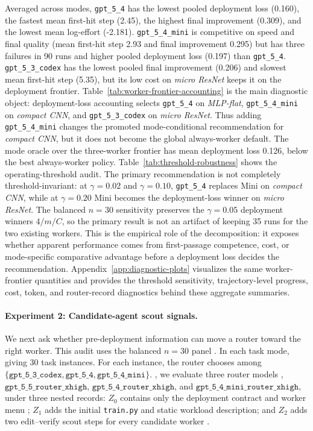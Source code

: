 \documentclass{article}
\begin{document}
Averaged across modes, \texttt{gpt\_5\_4} has the lowest pooled deployment loss (0.160), the fastest mean first-hit step (2.45), the highest final improvement (0.309), and the lowest mean log-effort (-2.181).
\texttt{gpt\_5\_4\_mini} is competitive on speed and final quality (mean first-hit step 2.93 and final improvement 0.295) but has three failures in 90 runs and higher pooled deployment loss (0.197) than \texttt{gpt\_5\_4}.
\texttt{gpt\_5\_3\_codex} has the lowest pooled final improvement (0.206) and slowest mean first-hit step (5.35), but its low cost on \textit{micro ResNet} keeps it on the deployment frontier.
Table~\ref{tab:worker-frontier-accounting} is the main diagnostic object: deployment-loss accounting selects \texttt{gpt\_5\_4} on \textit{MLP-flat}, \texttt{gpt\_5\_4\_mini} on \textit{compact CNN}, and \texttt{gpt\_5\_3\_codex} on \textit{micro ResNet}.
Thus adding \texttt{gpt\_5\_4\_mini} changes the promoted mode-conditional recommendation for \textit{compact CNN}, but it does not become the global always-worker default.
The mode oracle over the three-worker frontier has mean deployment loss 0.126, below the best always-worker policy.
Table~\ref{tab:threshold-robustness} shows the operating-threshold audit.
The primary recommendation is not completely threshold-invariant: at \(\gamma=0.02\) and \(\gamma=0.10\), \texttt{gpt\_5\_4} replaces Mini on \textit{compact CNN}, while at \(\gamma=0.20\) Mini becomes the deployment-loss winner on \textit{micro ResNet}.
The balanced \(n=30\) sensitivity preserves the \(\gamma=0.05\) deployment winners \(4/m/C\), so the primary result is not an artifact of keeping 35 runs for the two existing workers.
This is the empirical role of the decomposition: it exposes whether apparent performance comes from first-passage competence, cost, or mode-specific comparative advantage before a deployment loss decides the recommendation.
Appendix~\ref{app:diagnostic-plots} visualizes the same worker-frontier quantities and provides the threshold sensitivity, trajectory-level progress, cost, token, and router-record diagnostics behind these aggregate summaries.

\paragraph{Experiment 2: Candidate-agent scout signals.}
We next ask whether pre-deployment information can move a router toward the right worker.
This audit uses the balanced \(n=30\) panel . In each task mode, giving 30 task instances.
For each instance, the router chooses among \(\{\texttt{gpt\_5\_3\_codex},\texttt{gpt\_5\_4},\texttt{gpt\_5\_4\_mini}\}\).
, we evaluate three router models , \(\texttt{gpt\_5\_5\_router\_xhigh}\), \(\texttt{gpt\_5\_4\_router\_xhigh}\), and \(\texttt{gpt\_5\_4\_mini\_router\_xhigh}\), under three nested records:
\(Z_0\) contains only the deployment contract  and worker menu ;
\(Z_1\) adds the initial \texttt{train.py}  and static  workload description;
and \(Z_2\) adds two edit--verify scout steps for every candidate worker .
\end{document}
